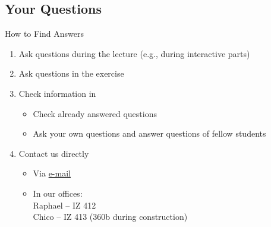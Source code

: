 \subsection{Your Questions}
\begin{frame}{\insertsubsection}
	\begin{fancycolumns}
		\begin{definition}{How to Find Answers}
			\begin{enumerate}
				\item<+-> Ask questions during the lecture (e.g., during interactive parts)
				\item<+-> Ask questions in the exercise
				\item<+-> Check information in \StudIP
				\begin{itemize}
					\item Check already answered questions
					\item Ask your own questions and answer questions of fellow students
				\end{itemize}
				\item<+-> Contact us directly
				\begin{itemize}
					\item Via \href{mailto:raphael.dunkel@tu-braunschweig.de?cc=chico.sundermann@tu-braunschweig.de&subject=[SE2]}{e-mail}
					\item In our offices:\\ Raphael -- IZ 412 \\ Chico -- IZ 413 (360b during construction)
				\end{itemize}
			\end{enumerate}
		\end{definition}
		\nextcolumn
	\end{fancycolumns}
\end{frame}
